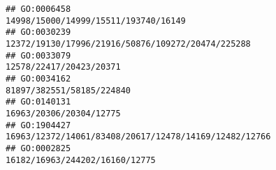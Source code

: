 \documentclass[
]{article}
\begin{document}
\begin{verbatim}
## GO:0006458                                                                                                                                                                                                                                                                                                                                                                         14998/15000/14999/15511/193740/16149
## GO:0030239                                                                                                                                                                                                                                                                                                                                                            12372/19130/17996/21916/50876/109272/20474/225288
## GO:0033079                                                                                                                                                                                                                                                                                                                                                                                      12578/22417/20423/20371
## GO:0034162                                                                                                                                                                                                                                                                                                                                                                                    81897/382551/58185/224840
## GO:0140131                                                                                                                                                                                                                                                                                                                                                                                      16963/20306/20304/12775
## GO:1904427                                                                                                                                                                                                                                                                                                                                                        16963/12372/14061/83408/20617/12478/14169/12482/12766
## GO:0002825                                                                                                                                                                                                                                                                                                                                                                               16182/16963/244202/16160/12775

\end{verbatim}
\end{document}
